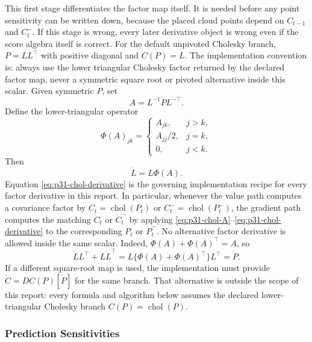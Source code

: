 \documentclass[11pt]{article}
\numberwithin{equation}{section}
\newcommand{\chol}{\operatorname{chol}}
\begin{document}
This first stage differentiates the factor map itself.  It is needed before any
point sensitivity can be written down, because the placed cloud points depend on
\(C_{t-1}\) and \(C_t^-\).  If this stage is wrong, every later derivative object
is wrong even if the score algebra itself is correct.  For the default
unpivoted Cholesky branch, \(P=LL^\top\) with positive diagonal and \(C(P)=L\).  The implementation convention is: always use the lower
triangular Cholesky factor returned by the declared factor map, never a
symmetric square root or pivoted alternative inside this scalar.  Given
symmetric \(\dot P\), set
\begin{equation}
  A=L^{-1}\dot P L^{-\top}.
  \label{eq:p31-chol-A}
\end{equation}
Define the lower-triangular operator
\begin{equation}
  \Phi(A)_{jk}
  =
  \begin{cases}
  A_{jk}, & j>k,\\
  A_{jj}/2, & j=k,\\
  0, & j<k.
  \end{cases}
  \label{eq:p31-chol-Phi}
\end{equation}
Then
\begin{equation}
  \dot L=L\Phi(A).
  \label{eq:p31-chol-derivative}
\end{equation}
Equation \eqref{eq:p31-chol-derivative} is the governing implementation recipe
for every factor derivative in this report.  In particular, whenever the value
path computes a covariance factor by \(C_t=\chol(P_t)\) or
\(C_t^-=\chol(P_t^-)\), the gradient path computes the matching
\(\dot C_t\) or \(\dot C_t^-\) by applying
\eqref{eq:p31-chol-A}--\eqref{eq:p31-chol-derivative} to the corresponding
\(\dot P_t\) or \(\dot P_t^-\).  No alternative factor derivative is allowed
inside the same scalar.
Indeed, \(\Phi(A)+\Phi(A)^\top=A\), so
\begin{equation}
  \dot LL^\top+L\dot L^\top
  =
  L\{\Phi(A)+\Phi(A)^\top\}L^\top
  =
  \dot P.
  \label{eq:p31-chol-check}
\end{equation}
If a different square-root map is used, the implementation must provide
\(\dot C=DC(P)[\dot P]\) for the same branch.  That alternative is outside the
scope of this report: every formula and algorithm below assumes the declared
lower-triangular Cholesky branch \(C(P)=\chol(P)\).

\subsubsection{Prediction Sensitivities}
\end{document}
